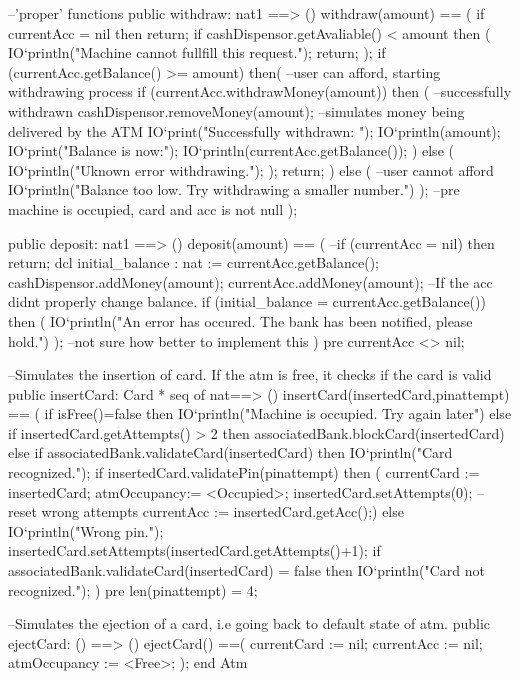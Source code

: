 \documentclass[a4paper]{article}
\begin{document}
\begin{vdm_al}
    --'proper' functions
    public withdraw: nat1 ==> ()
    withdraw(amount) == (
        if currentAcc = nil then return;
        if cashDispensor.getAvaliable() < amount then (
            IO`println("Machine cannot fullfill this request.");
            return;
        );
        if (currentAcc.getBalance() >= amount) then( --user can afford, starting withdrawing process
            if (currentAcc.withdrawMoney(amount)) then ( --successfully withdrawn
                cashDispensor.removeMoney(amount); --simulates money being delivered by the ATM
                IO`print("Successfully withdrawn: ");
                IO`println(amount);
                IO`print("Balance is now:");
                IO`println(currentAcc.getBalance());
                )
                else (
                    IO`println("Uknown error withdrawing.");
                );
        return;
        ) 
        else ( --user cannot afford
            IO`println("Balance too low. Try withdrawing a smaller number.")
        );
        --pre machine is occupied, card and acc is not null
    );

    public deposit: nat1 ==> ()
    deposit(amount) == (
        --if (currentAcc = nil) then return;
        dcl initial_balance : nat := currentAcc.getBalance();
        cashDispensor.addMoney(amount);
        currentAcc.addMoney(amount);
        --If the acc didnt properly change balance.
        if (initial_balance = currentAcc.getBalance()) then (
            IO`println("An error has occured. The bank has been notified, please hold.")
        ); --not sure how better to implement this
    )
    pre currentAcc <> nil;



    --Simulates the insertion of card. If the atm is free, it checks if the card is valid
    public insertCard: Card * seq of nat==> ()
    insertCard(insertedCard,pinattempt) == (
        if isFree()=false
        then IO`println("Machine is occupied. Try again later")
        else if insertedCard.getAttempts() > 2 then associatedBank.blockCard(insertedCard)
        else if associatedBank.validateCard(insertedCard)
        then IO`println("Card recognized.");
            if insertedCard.validatePin(pinattempt) then (
                currentCard := insertedCard;
                atmOccupancy:= <Occupied>;
                insertedCard.setAttempts(0); --reset wrong attempts 
                currentAcc := insertedCard.getAcc();)
            else 
            IO`println("Wrong pin.");
            insertedCard.setAttempts(insertedCard.getAttempts()+1);
        if associatedBank.validateCard(insertedCard) = false then IO`println("Card not recognized.");
    )
    pre len(pinattempt) = 4;
    
    --Simulates the ejection of a card, i.e going back to default state of atm.
    public ejectCard: () ==> () 
    ejectCard() ==(
        currentCard := nil;
        currentAcc := nil;
        atmOccupancy := <Free>;
    );    
end Atm
\end{vdm_al}
\end{document}
